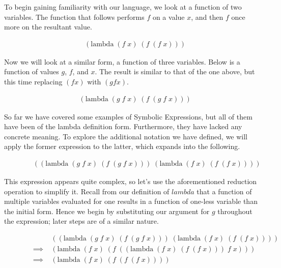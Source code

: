 To begin gaining familiarity with our language, we look at a function of two
variables. The function that follows performs $f$ on a value $x$, and then $f$
once more on the resultant value.

\begin{figure}[htp]
\caption{}\label{scheme}
\begin{align*}
& (\text{lambda} \; (f \; x) \; (f \; (f \; x)))
\end{align*}
\end{figure}

Now we will look at a similar form, a function of three variables. Below is a
function of values $g$, $f$, and $x$. The result is similar to that of the one
above, but this time replacing $(f x)$ with $(g f x)$.

\begin{figure}[htp]
\caption{}\label{scheme}
\begin{align*}
& (\text{lambda} \; (g \; f \; x) \; (f \; (g \; f \; x)))
\end{align*}
\end{figure}

So far we have covered some examples of Symbolic Expressions, but all of them have 
been of the lambda definition form. Furthermore, they have lacked any concrete
meaning. To explore the additional notation we have defined, we will apply the
former expression to the latter, which expands into the following.

\begin{figure}[htp]
\caption{}\label{scheme}
\begin{align*}
& ((\text{lambda} \; (g \; f \; x) \; (f \; (g \; f \; x))) \; (\text{lambda} \; (f \; x) \; (f \; (f \; x))))
\end{align*}
\end{figure}

This expression appears quite complex, so let's use the aforementioned reduction 
operation to simplify it. Recall from our definition of $lambda$ that a function
of multiple variables evaluated for one results in a function of one-less variable 
than the initial form. Hence we begin by substituting our argument for $g$
throughout the expression; later steps are of a similar nature.

\begin{figure}[htp]
\caption{}\label{scheme}
\begin{align*}
& &((\text{lambda} \; (g \; f \; x) \; (f \; (g \; f \; x))) \; (\text{lambda} \; (f \; x) \; (f \; (f \; x))))
\\& \implies \; &(\text{lambda} \; (f \; x) \; (f \; ((\text{lambda} \; (f \; x) \; (f \; (f \; x))) \; f \; x)))
\\& \implies \; &(\text{lambda} \; (f \; x) \; (f \; (f \; (f \; x))))
\end{align*}
\end{figure}

